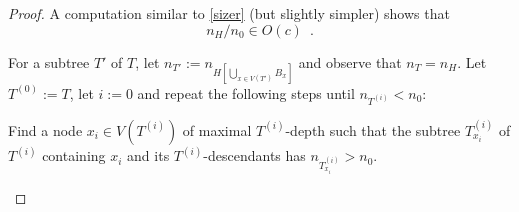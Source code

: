 \documentclass[kpfonts]{patmorin}
\newcommand\numberthis{\addtocounter{equation}{1}\tag{\theequation}}
\theoremstyle{named}
\begin{document}
\begin{proof}
    A computation similar to \cref{sizer} (but slightly simpler) shows that
    \begin{equation}
        n_H/n_0 \in O(c) \enspace . \label{heavy-size}
    \end{equation}

    For a subtree $T'$ of $T$, let $n_{T'}:=n_{H[\bigcup_{x\in V(T')}B_x]}$ and observe that $n_T=n_H$.
    Let $T^{(0)}:=T$, let $i:=0$ and repeat the following steps until
    $n_{T^{(i)}} < n_0$:
    \begin{compactenum}
        \item Find a node $x_{i}\in V(T^{(i)})$ of maximal $T^{(i)}$-depth such that the subtree $T^{(i)}_{x_i}$ of $T^{(i)}$ containing $x_i$ and its $T^{(i)}$-descendants has $n_{T^{(i)}_{x_i}} > n_0$.


\end{compactenum}
\end{proof}
\end{document}

